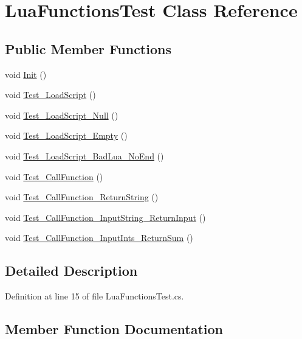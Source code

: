 \hypertarget{class_lua_functions_test}{}\section{Lua\+Functions\+Test Class Reference}
\label{class_lua_functions_test}
\subsection*{Public Member Functions}
\begin{DoxyCompactItemize}
\item 
void \hyperlink{class_lua_functions_test_a27f92aa0f706c25642ed5e4257553e88}{Init} ()
\item 
void \hyperlink{class_lua_functions_test_a7a082d5a77d4f76d9fa274215b7f0672}{Test\+\_\+\+Load\+Script} ()
\item 
void \hyperlink{class_lua_functions_test_a2b59f05675761eb487858a01ea3ea825}{Test\+\_\+\+Load\+Script\+\_\+\+Null} ()
\item 
void \hyperlink{class_lua_functions_test_ad715c476f6ee4279566d4a077deb4065}{Test\+\_\+\+Load\+Script\+\_\+\+Empty} ()
\item 
void \hyperlink{class_lua_functions_test_ab1f8d4772b9671a797d2c98db1c8ecdd}{Test\+\_\+\+Load\+Script\+\_\+\+Bad\+Lua\+\_\+\+No\+End} ()
\item 
void \hyperlink{class_lua_functions_test_a479ddb80cb1aae05eac4a301ed92617a}{Test\+\_\+\+Call\+Function} ()
\item 
void \hyperlink{class_lua_functions_test_a2b9bc51e73bded8bbe3710d25c6e5b2d}{Test\+\_\+\+Call\+Function\+\_\+\+Return\+String} ()
\item 
void \hyperlink{class_lua_functions_test_aa6da08835e166d534edf82c7744fa8c5}{Test\+\_\+\+Call\+Function\+\_\+\+Input\+String\+\_\+\+Return\+Input} ()
\item 
void \hyperlink{class_lua_functions_test_af42d0196de130f1f4adf8ac6cbad227e}{Test\+\_\+\+Call\+Function\+\_\+\+Input\+Ints\+\_\+\+Return\+Sum} ()
\end{DoxyCompactItemize}


\subsection{Detailed Description}


Definition at line 15 of file Lua\+Functions\+Test.\+cs.



\subsection{Member Function Documentation}
\mbox{\label{class_lua_functions_test_a27f92aa0f706c25642ed5e4257553e88}} 

